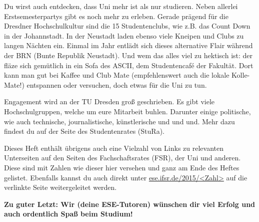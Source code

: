 Du wirst auch entdecken, dass Uni mehr ist als nur studieren. 
Neben allerlei Erstsemesterpartys gibt es noch mehr zu erleben. 
Gerade prägend für die Dresdner Hochschulkultur sind die 15 Studentenclubs, wie z.B. das Count Down in der Johannstadt. 
In der Neustadt laden ebenso viele Kneipen und Clubs zu langen Nächten ein. 
Einmal im Jahr entlädt sich dieses alternative Flair während der BRN (Bunte Republik Neustadt). 
Und wem das alles viel zu hektisch ist: der fläze sich gemütlich in ein Sofa des ASCII, dem Studentencafé der Fakultät. 
Dort kann man gut bei Kaffee und Club Mate (empfehlenswert auch die lokale Kolle-Mate!) entspannen oder versuchen, doch etwas für die Uni zu tun.

Engagement wird an der TU Dresden groß geschrieben. 
Es gibt viele Hochschulgruppen, welche um eure Mitarbeit buhlen. 
Darunter einige politische, wie auch technische, journalistische, künstlerische und und und. Mehr dazu findest du auf der Seite des Studentenrates (StuRa).

Dieses Heft enthält übrigens auch eine Vielzahl von Links zu relevanten Unterseiten auf den Seiten des Fachschaftsrates (FSR), der Uni und anderen. 
Diese sind mit Zahlen wie dieser hier  versehen und ganz am Ende des Heftes gelistet. Ebenfalls kannst du auch direkt unter \url{ese.ifsr.de/2015/<Zahl>} auf die verlinkte Seite weitergeleitet werden.

\textbf{Zu guter Letzt: Wir (deine ESE-Tutoren) wünschen dir viel Erfolg und auch ordentlich Spaß beim Studium!}
